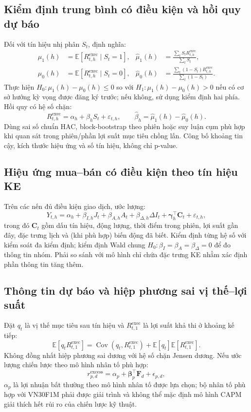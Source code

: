 \documentclass[12pt,a4paper,oneside]{article}
\newcommand{\E}{\mathbb{E}}
\newcommand{\Cov}{\operatorname{Cov}}
\begin{document}
\subsection{Kiểm định trung bình có điều kiện và hồi quy dự báo}
Đối với tín hiệu nhị phân $S_t$, định nghĩa:
\begin{align}
\mu_1(h)&=\E[R_{t,h}^{\mathrm{exec}}\mid S_t=1],&
\widehat\mu_1(h)&=\frac{\sum_t S_tR_{t,h}^{\mathrm{exec}}}{\sum_t S_t},\\
\mu_0(h)&=\E[R_{t,h}^{\mathrm{exec}}\mid S_t=0],&
\widehat\mu_0(h)&=\frac{\sum_t(1-S_t)R_{t,h}^{\mathrm{exec}}}{\sum_t(1-S_t)}.
\end{align}
Thực hiện $H_0:\mu_1(h)-\mu_0(h)\leq0$ so với $H_1:\mu_1(h)-\mu_0(h)>0$ nếu có cơ sở hướng kỳ vọng được đăng ký trước; nếu không, sử dụng kiểm định hai phía. Hồi quy có hệ số chặn:
\begin{equation}
R_{t,h}^{\mathrm{exec}}=\alpha_h+\beta_h S_t+\varepsilon_{t,h},\qquad
\widehat\beta_h=\widehat\mu_1(h)-\widehat\mu_0(h).
\end{equation}
Dùng sai số chuẩn HAC, block-bootstrap theo phiên hoặc suy luận cụm phù hợp khi quan sát trong phiên/phần lợi suất mục tiêu chồng lấn. Công bố khoảng tin cậy, kích thước hiệu ứng và số tín hiệu, không chỉ p-value.

\subsection{Hiệu ứng mua--bán có điều kiện theo tín hiệu KE}
Trên các nến đủ điều kiện giao dịch, ước lượng:
\begin{equation}\label{eq:increment}
Y_{t,h}=\alpha_h+\beta_{I,h} J_t+\beta_{A,h}A_t
+\beta_{\Delta,h}\Delta I_t+\bm\gamma_h^\top\bm C_t+\varepsilon_{t,h},
\end{equation}
trong đó $\bm C_t$ gồm dấu tín hiệu, động lượng, thời điểm trong phiên, lợi suất gần đây, đặc trưng lịch và (khi phù hợp) biến động đã biết. Kiểm định từng hệ số với kiểm soát đa kiểm định; kiểm định Wald chung $H_0:\beta_I=\beta_A=\beta_\Delta=0$ để đo thông tin nhóm. Phải so sánh với mô hình chỉ chứa đặc trưng KE nhằm xác định phần thông tin tăng thêm.

\subsection{Thông tin dự báo và hiệp phương sai vị thế--lợi suất}
Đặt $q_t$ là vị thế mục tiêu sau tín hiệu và $R_{t,1}^{\mathrm{exec}}$ là lợi suất khả thi ở khoảng kế tiếp:
\begin{equation}
\E[q_tR_{t,1}^{\mathrm{exec}}]=\Cov(q_t,R_{t,1}^{\mathrm{exec}})
+\E[q_t]\E[R_{t,1}^{\mathrm{exec}}].
\end{equation}
Không đồng nhất hiệp phương sai dương với hệ số chặn Jensen dương. Nếu ước lượng chiến lược theo mô hình nhân tố phù hợp:
\begin{equation}
r_{p,d}^{\mathrm{excess}}=\alpha_p+\bm\beta_p^\top\bm F_d+\epsilon_{p,d},
\end{equation}
$\alpha_p$ là lợi nhuận bất thường theo mô hình nhân tố được lựa chọn; bộ nhân tố phù hợp với VN30F1M phải được giải trình và không thể mặc định mô hình CAPM giải thích hết rủi ro của chiến lược kỹ thuật.
\end{document}
